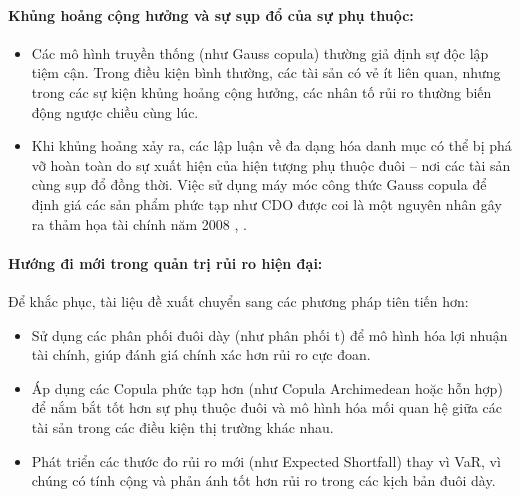 \paragraph{Khủng hoảng cộng hưởng và sự sụp đổ của sự phụ thuộc:}
\begin{itemize}
    \item Các mô hình truyền thống (như Gauss copula) thường giả định sự độc lập tiệm cận. Trong điều kiện bình thường, các tài sản có vẻ ít liên quan, nhưng trong các sự kiện khủng hoảng cộng hưởng, các nhân tố rủi ro thường biến động ngược chiều cùng lúc.
    \item Khi khủng hoảng xảy ra, các lập luận về đa dạng hóa danh mục có thể bị phá vỡ hoàn toàn do sự xuất hiện của hiện tượng phụ thuộc đuôi – nơi các tài sản cùng sụp đổ đồng thời. Việc sử dụng máy móc công thức Gauss copula để định giá các sản phẩm phức tạp như CDO được coi là một nguyên nhân gây ra thảm họa tài chính năm 2008  \cite{andersen2004extensions}, \cite{brigo2010credit}.
\end{itemize}
 
\paragraph{Hướng đi mới trong quản trị rủi ro hiện đại:}
Để khắc phục, tài liệu đề xuất chuyển sang các phương pháp tiên tiến hơn:
\begin{itemize}
    \item Sử dụng các phân phối đuôi dày (như phân phối t) để mô hình hóa lợi nhuận tài chính, giúp đánh giá chính xác hơn rủi ro cực đoan.
    \item Áp dụng các Copula phức tạp hơn (như Copula Archimedean hoặc hỗn hợp) để nắm bắt tốt hơn sự phụ thuộc đuôi và mô hình hóa mối quan hệ giữa các tài sản trong các điều kiện thị trường khác nhau.
    \item Phát triển các thước đo rủi ro mới (như Expected Shortfall) thay vì VaR, vì chúng có tính cộng và phản ánh tốt hơn rủi ro trong các kịch bản đuôi dày.
\end{itemize}
